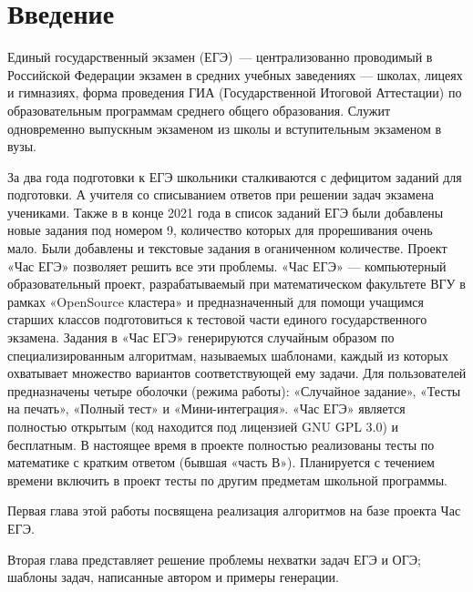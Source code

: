 
\section*{Введение}
Единый государственный экзамен (ЕГЭ)~— централизованно проводимый в Российской
Федерации экзамен в средних учебных заведениях — школах, лицеях и гимназиях,
форма проведения ГИА (Государственной Итоговой Аттестации) по образовательным программам среднего общего образования.
Служит одновременно выпускным экзаменом из школы и вступительным экзаменом в вузы.

За два года подготовки к ЕГЭ школьники сталкиваются с дефицитом заданий для подготовки. 
А учителя со списыванием ответов при решении задач экзамена учениками. 
Также в в конце 2021 года в список заданий ЕГЭ были добавлены новые задания под номером 9, 
количество которых для прорешивания очень мало. Были добавлены и текстовые задания в оганиченном количестве.
Проект «Час ЕГЭ» позволяет решить все эти проблемы. «Час ЕГЭ» — компьютерный образовательный проект, 
разрабатываемый при математическом факультете ВГУ в рамках «OpenSource кластера» и предназначенный для помощи учащимся старших классов подготовиться к тестовой части единого государственного экзамена. 
Задания в «Час ЕГЭ» генерируются случайным образом по специализированным алгоритмам, называемых шаблонами, 
каждый из которых охватывает множество вариантов соответствующей ему задачи. 
Для пользователей предназначены четыре оболочки (режима работы): «Случайное задание», «Тесты на печать», «Полный тест» и «Мини-интеграция». 
«Час ЕГЭ» является полностью открытым (код находится под лицензией GNU GPL 3.0) и бесплатным. 
В настоящее время в проекте полностью реализованы тесты по математике с кратким ответом (бывшая «часть В»). 
Планируется с течением времени включить в проект тесты по другим предметам школьной программы.

Первая глава этой работы посвящена реализация алгоритмов на базе проекта Час ЕГЭ.

Вторая глава представляет решение проблемы нехватки задач ЕГЭ и ОГЭ; шаблоны задач, написанные автором и примеры генерации.